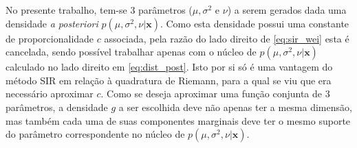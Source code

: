 No presente trabalho, tem-se 3 parâmetros ($\mu, \sigma^2$ e $\nu$) a serem gerados dada uma densidade \textit{a posteriori} $p(\mu, \sigma^2, \nu | \bm{x})$. Como esta densidade possui uma constante de proporcionalidade $c$ associada, pela razão do lado direito de \eqref{eq:sir_wei} esta é cancelada, sendo possível trabalhar apenas com o núcleo de $p(\mu, \sigma^2, \nu | \bm{x})$ calculado no lado direito em \eqref{eq:dist_post}. Isto por si só é uma vantagem do método SIR em relação à quadratura de Riemann, para a qual se viu que era necessário aproximar $c$. Como se deseja aproximar uma função conjunta de 3 parâmetros, a densidade $g$ a ser escolhida deve não apenas ter a mesma dimensão, mas também cada uma de suas componentes marginais deve ter o mesmo suporte do parâmetro correspondente no núcleo de $p(\mu, \sigma^2, \nu | \bm{x})$.

